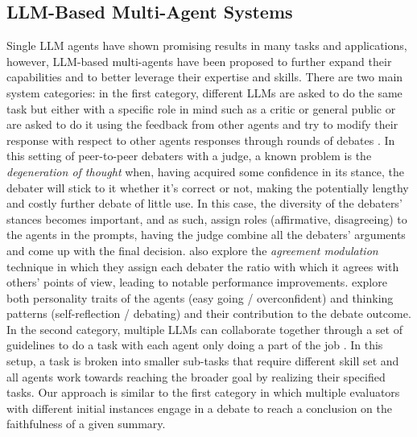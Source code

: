 \subsection{LLM-Based Multi-Agent Systems}

Single LLM agents have shown promising results in many tasks and applications, however, LLM-based multi-agents have been proposed to further expand their capabilities and to better leverage their expertise and skills.  
There are two main system categories: in the first category, different LLMs are asked to do the same task but either with a specific role in mind such as a critic or general public \cite{chan2023chateval} or are asked to do it using the feedback from other agents and try to modify their response with respect to other agents responses through rounds of debates \cite{du2023improving}. In this setting of peer-to-peer debaters with a judge, a known problem is the {\it degeneration of thought} when, having acquired some confidence in its stance, the debater will stick to it whether it's correct or not, making the potentially lengthy and costly further debate of little use. In this case, the diversity of the debaters' stances becomes important, and as such, \citet{DBLP:journals/corr/abs-2305-19118} assign roles (affirmative, disagreeing) to the agents in the prompts, having the judge combine all the debaters' arguments and come up with the final decision. \citet{DBLP:conf/icml/SmitGDBP24} also explore the {\it agreement modulation} technique in which they assign each debater the ratio with which it agrees with others' points of view, leading to notable performance improvements. \citet{DBLP:conf/acl/ZhangX0LHD24} explore both personality traits of the agents (easy going / overconfident) and thinking patterns (self-reflection / debating) and their contribution to the debate outcome. In the second category, multiple LLMs can collaborate together through a set of guidelines to do a task with each agent only doing a part of the job \cite{mandi2024roco, qian2024chatdev, hong2023metagpt, lan2024stance}. In this setup, a task is broken into smaller sub-tasks that require different skill set and all agents work towards reaching the broader goal by realizing their specified tasks. 
Our approach is similar to the first category in which multiple evaluators with different initial instances engage in a debate to reach a conclusion on the faithfulness of a given summary.
